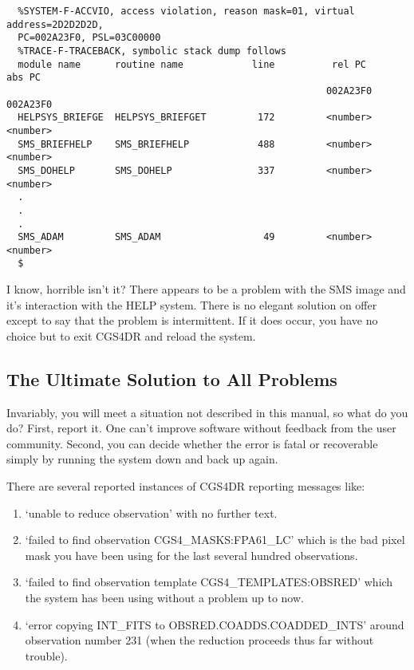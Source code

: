 {\begin{verbatim}
  %SYSTEM-F-ACCVIO, access violation, reason mask=01, virtual address=2D2D2D2D,
  PC=002A23F0, PSL=03C00000
  %TRACE-F-TRACEBACK, symbolic stack dump follows
  module name      routine name            line          rel PC      abs PC
                                                        002A23F0    002A23F0
  HELPSYS_BRIEFGE  HELPSYS_BRIEFGET         172         <number>    <number>
  SMS_BRIEFHELP    SMS_BRIEFHELP            488         <number>    <number>
  SMS_DOHELP       SMS_DOHELP               337         <number>    <number>
  .
  .
  .
  SMS_ADAM         SMS_ADAM                  49         <number>    <number>
  $ 
\end{verbatim}

I know, horrible isn't it? There appears to be a problem
with the SMS image and it's interaction with the HELP system.
There is no elegant solution on offer except to say that the problem is
intermittent. If it does occur, you have no choice but to exit CGS4DR and
reload the system.

\subsection{The Ultimate Solution to All Problems}
\label{the_ultimate_solution_to_all_problems}

Invariably, you will meet a situation not described in this manual, so what
do you do? First, report it. One can't improve software without feedback from
the user community. Second, you can decide whether the error is fatal
or recoverable simply by running the system down and back up again.

There are several reported instances of CGS4DR reporting messages like:

\begin{enumerate}
\item {\sf `unable to reduce observation'} with no further text. 
\item {\sf `failed to find observation CGS4\_MASKS:FPA61\_LC'} which is the
      bad pixel mask you have been using for the last several hundred
      observations.
\item {\sf `failed to find observation template CGS4\_TEMPLATES:OBSRED'} 
      which the system has been using without a problem up to now.
\item {\sf `error copying INT\_FITS to OBSRED.COADDS.COADDED\_INTS'} around
      observation number 231 (when the reduction proceeds thus far without
      trouble).
\end{enumerate}

}
